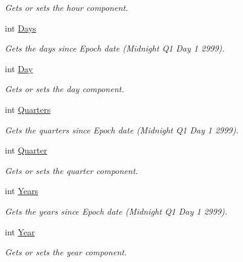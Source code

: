 \begin{DoxyCompactItemize}
\begin{DoxyCompactList}\small\item\em Gets or sets the hour component. \end{DoxyCompactList}\item 
int \hyperlink{struct_world_time_a379145f430beff5a39c3d322a492e342}{Days}
\begin{DoxyCompactList}\small\item\em Gets the days since Epoch date (Midnight Q1 Day 1 2999). \end{DoxyCompactList}\item 
int \hyperlink{struct_world_time_a68b3e2fb2b048f6fdb3662f4434fb833}{Day}
\begin{DoxyCompactList}\small\item\em Gets or sets the day component. \end{DoxyCompactList}\item 
int \hyperlink{struct_world_time_aa6543f028b3054c16b1bd4f1e27ed17d}{Quarters}
\begin{DoxyCompactList}\small\item\em Gets the quarters since Epoch date (Midnight Q1 Day 1 2999). \end{DoxyCompactList}\item 
int \hyperlink{struct_world_time_aa57cb1c36848da0bfb42629fde45222d}{Quarter}
\begin{DoxyCompactList}\small\item\em Gets or sets the quarter component. \end{DoxyCompactList}\item 
int \hyperlink{struct_world_time_a59f52857aaf1f9f7efe9eac2da340970}{Years}
\begin{DoxyCompactList}\small\item\em Gets the years since Epoch date (Midnight Q1 Day 1 2999). \end{DoxyCompactList}\item 
int \hyperlink{struct_world_time_a0050f0f2e331b49641207a94c6c83fe2}{Year}
\begin{DoxyCompactList}\small\item\em Gets or sets the year component. \end{DoxyCompactList}\end{DoxyCompactItemize}


